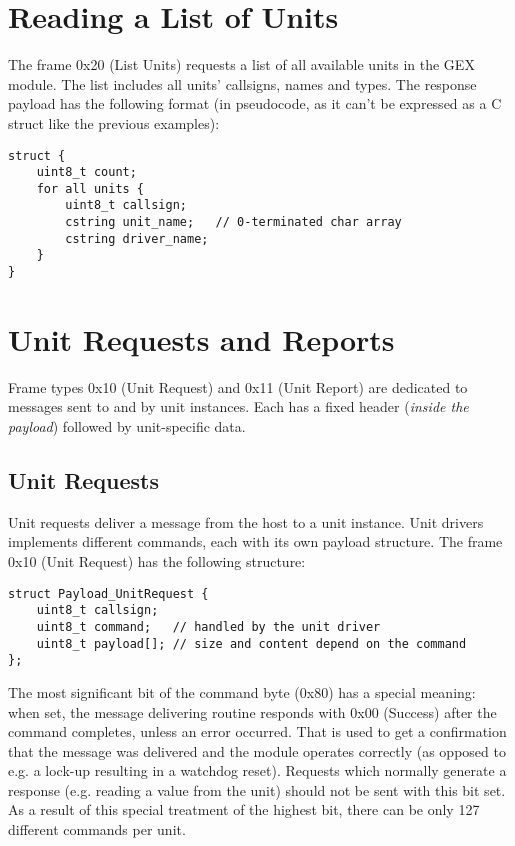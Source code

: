 \section{Reading a List of Units}

The frame 0x20 (List Units) requests a list of all available units in the GEX module. The list includes all units' callsigns, names and types. The response payload has the following format (in pseudocode, as it can't be expressed as a C struct like the previous examples):

\begin{verbatim}
struct {
    uint8_t count;
    for all units {
        uint8_t callsign;
        cstring unit_name;   // 0-terminated char array
        cstring driver_name;
    }
}
\end{verbatim}


\section{Unit Requests and Reports}

Frame types 0x10 (Unit Request) and 0x11 (Unit Report) are dedicated to messages sent to and by unit instances. Each has a fixed header (\textit{inside the payload}) followed by unit-specific data.

\subsection{Unit Requests}

Unit requests deliver a message from the host to a unit instance. Unit drivers implements different commands, each with its own payload structure. The frame 0x10 (Unit Request) has the following structure:

\begin{verbatim}
struct Payload_UnitRequest {
    uint8_t callsign;
    uint8_t command;   // handled by the unit driver
    uint8_t payload[]; // size and content depend on the command
};
\end{verbatim}

The most significant bit of the command byte (0x80) has a special meaning: when set, the message delivering routine responds with 0x00 (Success) after the command completes, unless an error occurred. That is used to get a confirmation that the message was delivered and the module operates correctly (as opposed to e.g. a lock-up resulting in a watchdog reset). Requests which normally generate a response (e.g. reading a value from the unit) should not be sent with this bit set. As a result of this special treatment of the highest bit, there can be only 127 different commands per unit.

